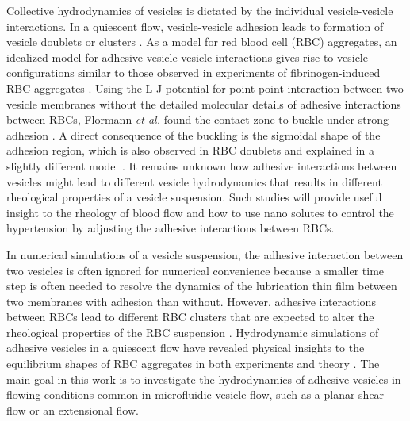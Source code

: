 \documentclass[prf,superscriptaddress,showpacs]{revtex4-1}
\begin{document}
%
%
Collective hydrodynamics of vesicles is dictated by the individual
vesicle-vesicle interactions.  
In a quiescent flow,
vesicle-vesicle adhesion leads to formation of vesicle doublets \cite{ZiherlSvetina2007_PNAS} or clusters \cite{SvetinaZiherl2008_Bioelectrochemistry,FlormannAouane2017_SciReports}.
As a model for red blood cell (RBC) aggregates, an idealized model for adhesive vesicle-vesicle interactions gives rise to 
vesicle configurations similar to those observed in experiments of fibrinogen-induced RBC aggregates \cite{SvetinaZiherl2008_Bioelectrochemistry,FlormannAouane2017_SciReports}. 
Using the L-J potential for point-point interaction between two vesicle membranes without the detailed molecular details of
adhesive interactions between RBCs, Flormann {\it et al.} found the contact zone to buckle under strong adhesion \cite{FlormannAouane2017_SciReports}. 
A direct consequence of the buckling is the
sigmoidal shape of the adhesion region, which is also observed in RBC doublets and explained in a slightly different model \cite{ZiherlSvetina2007_PNAS}. 
It remains unknown how adhesive interactions between vesicles might lead to different vesicle hydrodynamics that results in
different rheological properties of a vesicle suspension. Such studies will provide useful insight to the rheology of blood flow and how to use nano solutes to control the hypertension
by adjusting the adhesive interactions between RBCs.
%

In numerical simulations of  a vesicle suspension, the adhesive interaction between two vesicles is often ignored \cite{Veerapaneni2009_JCP,RahimianVeerapaneniBiros2010_JCP} 
for numerical convenience
because a smaller time step is often needed to resolve the dynamics of the lubrication thin film between two membranes with adhesion than without.
However, adhesive interactions  between RBCs lead to different RBC clusters that are expected to alter the rheological properties of the RBC suspension \cite{NeuMeiselman2002_BiophysJ,SvetinaZiherl2008_Bioelectrochemistry}.
Hydrodynamic simulations of adhesive vesicles in a quiescent flow have revealed physical insights to the equilibrium shapes of RBC aggregates in both experiments 
\cite{FlormannAouane2017_SciReports} and theory \cite{ZiherlSvetina2007_PNAS}. The main goal in this work is to investigate the hydrodynamics of adhesive vesicles in flowing
conditions common in microfluidic vesicle flow, such as a planar shear flow or an extensional flow.
\end{document}
